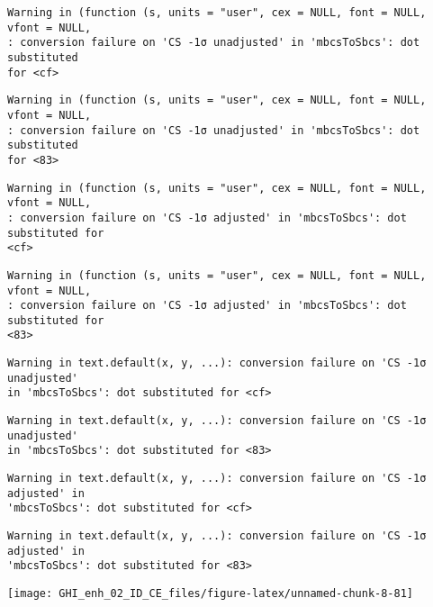 \documentclass[
  10pt,
  a4paper,oneside]{article}
\begin{document}
\begin{verbatim}
Warning in (function (s, units = "user", cex = NULL, font = NULL, vfont = NULL,
: conversion failure on 'CS -1σ unadjusted' in 'mbcsToSbcs': dot substituted
for <cf>
\end{verbatim}

\begin{verbatim}
Warning in (function (s, units = "user", cex = NULL, font = NULL, vfont = NULL,
: conversion failure on 'CS -1σ unadjusted' in 'mbcsToSbcs': dot substituted
for <83>
\end{verbatim}

\begin{verbatim}
Warning in (function (s, units = "user", cex = NULL, font = NULL, vfont = NULL,
: conversion failure on 'CS -1σ adjusted' in 'mbcsToSbcs': dot substituted for
<cf>
\end{verbatim}

\begin{verbatim}
Warning in (function (s, units = "user", cex = NULL, font = NULL, vfont = NULL,
: conversion failure on 'CS -1σ adjusted' in 'mbcsToSbcs': dot substituted for
<83>
\end{verbatim}

\begin{verbatim}
Warning in text.default(x, y, ...): conversion failure on 'CS -1σ unadjusted'
in 'mbcsToSbcs': dot substituted for <cf>
\end{verbatim}

\begin{verbatim}
Warning in text.default(x, y, ...): conversion failure on 'CS -1σ unadjusted'
in 'mbcsToSbcs': dot substituted for <83>
\end{verbatim}

\begin{verbatim}
Warning in text.default(x, y, ...): conversion failure on 'CS -1σ adjusted' in
'mbcsToSbcs': dot substituted for <cf>
\end{verbatim}

\begin{verbatim}
Warning in text.default(x, y, ...): conversion failure on 'CS -1σ adjusted' in
'mbcsToSbcs': dot substituted for <83>
\end{verbatim}

\begin{center}\texttt{[image: GHI\_enh\_02\_ID\_CE\_files/figure-latex/unnamed-chunk-8-81]} \end{center}
\end{document}
